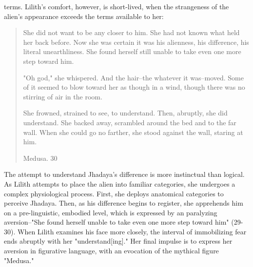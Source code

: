 \documentclass[11pt]{article}
\begin{document}
terms. Lilith's comfort, however, is short-lived, when the strangeness
of the alien's appearance exceeds the terms available to her:
\begin{quote}
She did not want to be any closer to him. She had not known what held
her back before. Now she was certain it was his alienness, his
difference, his literal unearthliness. She found herself still unable
to take even one more step toward him.

"Oh god," she whispered. And the hair--the whatever it
was--moved. Some of it seemed to blow toward her as though in a wind,
though there was no stirring of air in the room.

She frowned, strained to see, to understand. Then, abruptly, she did
understand. She backed away, scrambled around the bed and to the far
wall. When she could go no farther, she stood against the wall,
staring at him.

Medusa. 30
\end{quote}
The attempt to understand Jhadaya's difference is more instinctual
than logical. As Lilith attempts to place the alien into familiar
categories, she undergoes a complex physiological process. First, she
deploys anatomical categories to perceive Jhadaya. Then, as his
difference begins to register, she apprehends him on a pre-linguistic,
embodied level, which is expressed by an paralyzing aversion--"She
found herself unable to take even one more step toward him"
(29-30). When Lilith examines his face more closely, the interval of
immobilizing fear ends abruptly with her "understand[ing]." Her final
impulse is to express her aversion in figurative language, with an
evocation of the mythical figure "Medusa."
\end{document}
